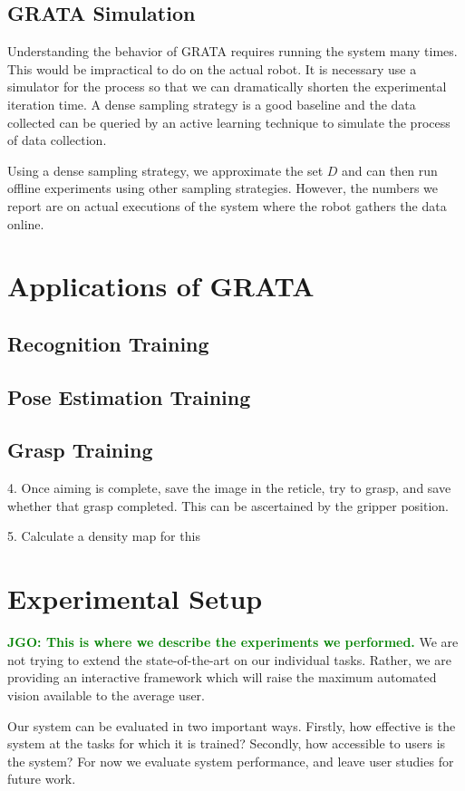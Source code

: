 \documentclass[conference]{IEEEtran}
\newcommand{\jgonote}[1]{\textcolor{green}{\textbf{JGO: #1}}}
\begin{document}
\subsection{GRATA Simulation}
Understanding the behavior of GRATA requires running the system many times. This would be impractical
to do on the actual robot. It is necessary use a simulator for the process so that we can dramatically shorten the
experimental iteration time. A dense sampling strategy is a good baseline and the data collected can
be queried by an active learning technique to simulate the process of data collection.

Using a dense sampling strategy, we approximate the set $D$ and can then run offline experiments using other
sampling strategies. However, the numbers we report are on actual executions of the system where
the robot gathers the data online.


\section{Applications of GRATA}

\subsection{Recognition Training}

\subsection{Pose Estimation Training}

\subsection{Grasp Training}
4. Once aiming is complete, save the image in the reticle, try to grasp, and save whether that grasp completed.
This can be ascertained by the gripper position.

5. Calculate a density map for this 


\section{Experimental Setup}
\jgonote{This is where we describe the experiments we performed.}
We are not trying to extend the state-of-the-art on our individual tasks. Rather,
we are providing an interactive framework which will raise the maximum automated vision
available to the average user.

Our system can be evaluated in two important ways. Firstly, how effective is 
the system at the tasks for which it is trained? Secondly, how accessible to users is the system?
For now we evaluate system performance, and leave user studies for future work.
\end{document}
